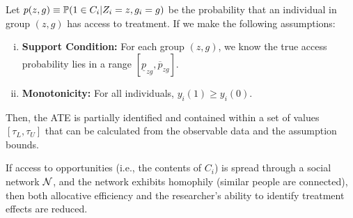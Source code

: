 \begin{theorem}\label{thm:bounds}
Let $p(z, g) \equiv \mathbb{P}(1 \in C_i | Z_i=z, g_i=g)$ be the probability that an individual in group $(z,g)$ has access to treatment. If we make the following assumptions:
\begin{enumerate}[(i)]
    \item \textbf{Support Condition:} For each group $(z,g)$, we know the true access probability lies in a range $[\underline{p}_{zg}, \overline{p}_{zg}]$.
    \item \textbf{Monotonicity:} For all individuals, $y_i(1) \ge y_i(0)$.
\end{enumerate}
Then, the ATE is partially identified and contained within a set of values $[\tau_L, \tau_U]$ that can be calculated from the observable data and the assumption bounds.
\end{theorem}

\begin{theorem}\label{thm:networks}
If access to opportunities (i.e., the contents of $C_i$) is spread through a social network $\mathcal{N}$, and the network exhibits homophily (similar people are connected), then both allocative efficiency and the researcher's ability to identify treatment effects are reduced.
\end{theorem}